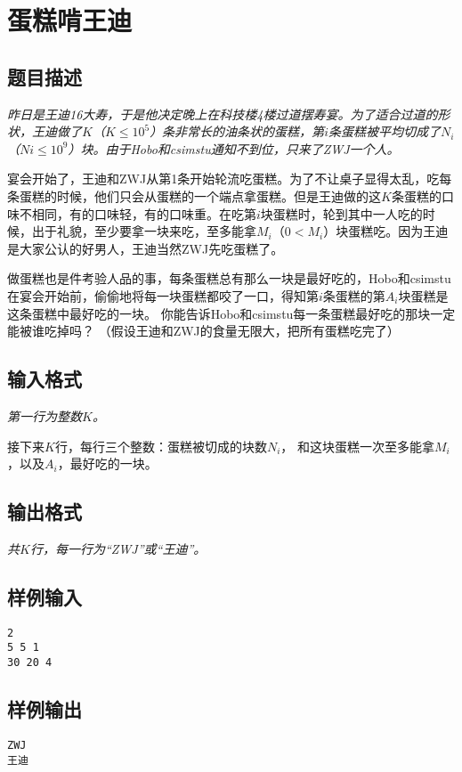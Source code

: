 \section{蛋糕啃王迪}
\subsection{题目描述}
{\itshape
	昨日是王迪16大寿，于是他决定晚上在科技楼4楼过道摆寿宴。为了适合过道的形状，王迪做了$K$（$K \le 10^5$）条非常长的油条状的蛋糕，第$i$条蛋糕被平均切成了$N_i$（$Ni \le 10^9$）块。由于Hobo和csimstu通知不到位，只来了ZWJ一个人。\par
		宴会开始了，王迪和ZWJ从第1条开始轮流吃蛋糕。为了不让桌子显得太乱，吃每条蛋糕的时候，他们只会从蛋糕的一个端点拿蛋糕。但是王迪做的这$K$条蛋糕的口味不相同，有的口味轻，有的口味重。在吃第$i$块蛋糕时，轮到其中一人吃的时候，出于礼貌，至少要拿一块来吃，至多能拿$M_i$（$0 < M_i$）块蛋糕吃。因为王迪是大家公认的好男人，王迪当然ZWJ先吃蛋糕了。 \par
		做蛋糕也是件考验人品的事，每条蛋糕总有那么一块是最好吃的，Hobo和csimstu在宴会开始前，偷偷地将每一块蛋糕都咬了一口，得知第$i$条蛋糕的第$A_i$块蛋糕是这条蛋糕中最好吃的一块。
		你能告诉Hobo和csimstu每一条蛋糕最好吃的那块一定能被谁吃掉吗？
		（假设王迪和ZWJ的食量无限大，把所有蛋糕吃完了）
}
\subsection{输入格式}
{\itshape
第一行为整数$K$。
\par 接下来$K$行，每行三个整数：蛋糕被切成的块数$N_i$，
和这块蛋糕一次至多能拿$M_i$，以及$A_i$，最好吃的一块。
}
\subsection{输出格式}
{\itshape 共$K$行，每一行为“ZWJ”或“王迪”。}
\subsection{样例输入}
\begin{verbatim}
2
5 5 1
30 20 4
\end{verbatim}
\subsection{样例输出}
\begin{verbatim}
ZWJ
王迪
\end{verbatim}
